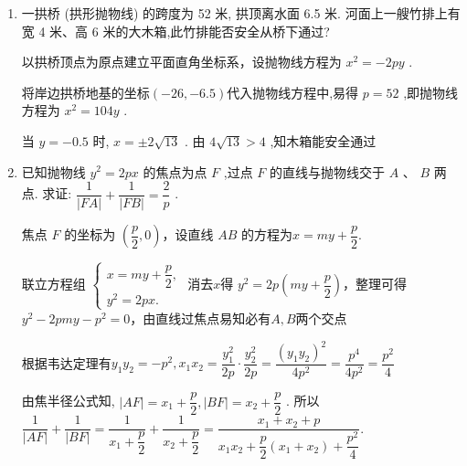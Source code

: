 \begin{enumerate}
\begin{jieda}
        故${\left( {x}_{1} - {x}_{2}\right) }^{2} = {\left( {x}_{1} + {x}_{2}\right) }^{2} - 4{x}_{1}{x}_{2} = {\left( \dfrac{a - 4}{4}\right) }^{2} - 1 = \dfrac{{a}^{2} - {8a}}{16}$
        
        $\left| AB\right|^{2} = 5{\left( {x}_{1} - {x}_{2}\right) }^{2} = \dfrac{5\left( {{a}^{2} - {8a}}\right) }{16} = {15}$ . 解得 $a = {12}$ 或 $a =  - 4$ .
        
        因此,所求抛物线的方程为 ${y}^{2} = {12x}$ 或 ${y}^{2} =  - {4x}$ .
    \end{jieda}

    \item 一拱桥 (拱形抛物线) 的跨度为 52 米, 拱顶离水面 6.5 米. 河面上一艘竹排上有宽 4 米、高 6 米的大木箱,此竹排能否安全从桥下通过?
    \begin{jieda}
        以拱桥顶点为原点建立平面直角坐标系，设抛物线方程为 ${x}^{2} =  - {2py}$ . 
        
        将岸边拱桥地基的坐标$(-26, - 6.5)$代入抛物线方程中,易得 $p = {52}$ ,即抛物线方程为 ${x}^{2} = {104y}$ . 
        
        当 $y =  - {0.5}$ 时, $x =  \pm  2\sqrt{13}$ . 由 $4\sqrt{13} > 4$ ,知木箱能安全通过
    \end{jieda}

    \item 已知抛物线 ${y}^{2} = {2px}$ 的焦点为点 $F$ ,过点 $F$ 的直线与抛物线交于 $A\text{ 、 }B$ 两点. 求证: $\dfrac{1}{\left| FA\right| } + \dfrac{1}{\left| FB\right| } = \dfrac{2}{p}$ .
    \begin{jieda}
        焦点 $F$ 的坐标为 $\left( {\dfrac{p}{2},0}\right)$，设直线 ${AB}$ 的方程为$x = my+\dfrac{p}{2}$.
        
        联立方程组 $\left\{  \begin{array}{l} 
            x = my+\dfrac{p}{2}, \\  
            {y}^{2} = {2px}. \end{array}\right.$ 
        消去$x$得 ${y}^{2} = 2p\left(my+\dfrac{p}{2}\right)$，整理可得$y^2 - 2pmy - p^2 = 0$，由直线过焦点易知必有$A, B$两个交点
        
        根据韦达定理有${y}_{1}{y}_{2} =  - {p}^{2},{x}_{1}{x}_{2} = \dfrac{{y}_{1}^{2}}{2p} \cdot  \dfrac{{y}_{2}^{2}}{2p} = \dfrac{{\left( {y}_{1}{y}_{2}\right) }^{2}}{4{p}^{2}} = \dfrac{{p}^{4}}{4{p}^{2}} = \dfrac{{p}^{2}}{4}$ 

        由焦半径公式知, $\left| {AF}\right|  = {x}_{1} + \dfrac{p}{2},\left| {BF}\right|  = {x}_{2} + \dfrac{p}{2}$ . 所以$\dfrac{1}{\left| AF\right| } + \dfrac{1}{\left| BF\right| } = \dfrac{1}{{x}_{1} + \dfrac{p}{2}} + \dfrac{1}{{x}_{2} + \dfrac{p}{2}} = \dfrac{{x}_{1} + {x}_{2} + p}{{x}_{1}{x}_{2} + \dfrac{p}{2}\left( {{x}_{1} + {x}_{2}}\right)  + \dfrac{{p}^{2}}{4}}.$
        

\end{jieda}
\end{enumerate}
